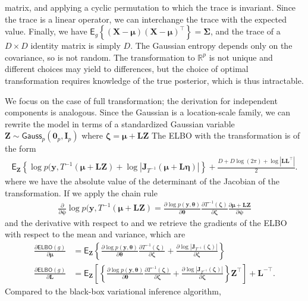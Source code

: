 \documentclass[
  11pt,
  letterpaper,
]{scrbook}
\theoremstyle{definition}
\theoremstyle{definition}
\theoremstyle{definition}
\theoremstyle{plain}
\theoremstyle{plain}
\theoremstyle{plain}
\theoremstyle{remark}
\begin{document}
matrix, and applying a cyclic permutation to which the trace is
invariant. Since the trace is a linear operator, we can interchange the
trace with the expected value. Finally, we have
\(\mathsf{E}_g\left\{(\boldsymbol{X}-\boldsymbol{\mu})(\boldsymbol{X}-\boldsymbol{\mu})^\top\right\}=\boldsymbol{\Sigma}\),
and the trace of a \(D \times D\) identity matrix is simply \(D\). The
Gaussian entropy depends only on the covariance, so is not random. The
transformation to \(\mathbb{R}^p\) is not unique and different choices
may yield to differences, but the choice of optimal transformation
requires knowledge of the true posterior, which is thus intractable.

We focus on the case of full transformation; the derivation for
independent components is analogous. Since the Gaussian is a
location-scale family, we can rewrite the model in terms of a
standardized Gaussian variable
\(\boldsymbol{Z}\sim \mathsf{Gauss}_p(\boldsymbol{0}_p, \mathbf{I}_p)\)
where
\(\boldsymbol{\zeta} = \boldsymbol{\mu} + \mathbf{L}\boldsymbol{Z}\) The
ELBO with the transformation is of the form \begin{align*}
 \mathsf{E}_{\boldsymbol{Z}}\left\{ \log p(\boldsymbol{y}, T^{-1}(\boldsymbol{\mu} + \mathbf{L}\boldsymbol{Z}) + \log \left|\mathbf{J}_{T^{-1}}(\boldsymbol{\mu} + \mathbf{L}\boldsymbol{\eta})\right|\right\} +\frac{D+D\log(2\pi) + \log |\mathbf{LL}^\top|}{2}.
\end{align*} where we have the absolute value of the determinant of the
Jacobian of the transformation. If we apply the chain rule
\begin{align*}
 \frac{\partial}{\partial \boldsymbol{\psi}}\log p(\boldsymbol{y}, T^{-1}(\boldsymbol{\mu} + \mathbf{L}\boldsymbol{Z}) = \frac{\partial \log p(\boldsymbol{y}, \boldsymbol{\theta})}{\partial \boldsymbol{\theta}} \frac{\partial T^{-1}(\boldsymbol{\zeta})}{\partial \boldsymbol{\zeta}} \frac{\partial \boldsymbol{\mu} + \mathbf{L}\boldsymbol{Z}}{\partial \boldsymbol{\psi}}
\end{align*} and the derivative with respect to and we retrieve the
gradients of the ELBO with respect to the mean and variance, which are
\begin{align*}
 \frac{\partial \mathsf{ELBO}(g)}{\partial \boldsymbol{\mu}} &= \mathsf{E}_{\boldsymbol{Z}}\left\{\frac{\partial \log p(\boldsymbol{y}, \boldsymbol{\theta})}{\partial \boldsymbol{\theta}} \frac{\partial T^{-1}(\boldsymbol{\zeta})}{\partial \boldsymbol{\zeta}}  + \frac{\partial \log \left|\mathbf{J}_{T^{-1}}(\boldsymbol{\zeta})\right|}{\partial \boldsymbol{\zeta}}\right\} \\
 \frac{\partial \mathsf{ELBO}(g)}{\partial \mathbf{L}} &= \mathsf{E}_{\boldsymbol{Z}}\left[\left\{\frac{\partial \log p(\boldsymbol{y}, \boldsymbol{\theta})}{\partial \boldsymbol{\theta}} \frac{\partial T^{-1}(\boldsymbol{\zeta})}{\partial \boldsymbol{\zeta}}  + \frac{\partial \log \left|\mathbf{J}_{T^{-1}}(\boldsymbol{\zeta})\right|}{\partial \boldsymbol{\zeta}}\right\}\boldsymbol{Z}^\top\right] + \mathbf{L}^{-\top}.
\end{align*} Compared to the black-box variational inference algorithm,
\end{document}
